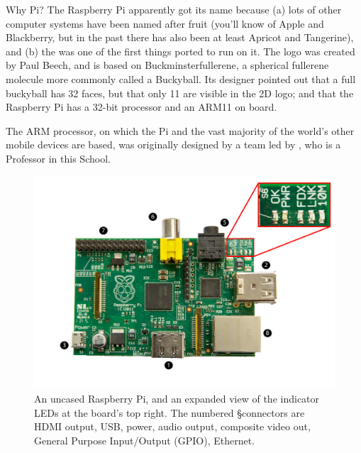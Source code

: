 \begin{rpi}{Why Pi?}
  The Raspberry Pi apparently got its name because (a) lots of other computer systems have been named after fruit (you'll know of Apple and Blackberry, but in the past there has also been at least Apricot and Tangerine), and (b) the  was one of the first things ported to run on it. The logo was created by Paul Beech, and is based on Buckminsterfullerene, a spherical fullerene molecule more commonly called a Buckyball. Its designer pointed out that a full buckyball has 32 faces, but that only 11 are visible in the 2D logo; and that the Raspberry Pi has a 32-bit processor and an ARM11 on board.

The ARM processor, on which the Pi and the vast majority of the world's other mobile devices are based, was originally designed by a team led by , who is a Professor in this School.  
\end{rpi}

\begin{figure}
\centerline{\includegraphics[width=15cm]{images/bare-rpi-annotated}}
\caption{An uncased Raspberry Pi, and an expanded view of the indicator LEDs at the board's top right. The numbered §connectors are \protect{} HDMI output,  \protect{} USB,  \protect{} power,  \protect{} audio output,  \protect{} composite video out,  \protect{} General Purpose Input/Output (GPIO),  \protect{} Ethernet.}\label{figure:bare-rpi}
\end{figure}


